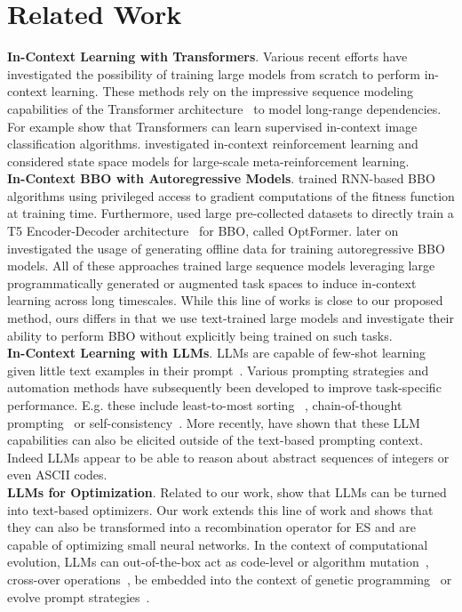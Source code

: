 \documentclass[sigconf]{acmart}
\begin{document}
\section{Related Work}
\textbf{In-Context Learning with Transformers}. Various recent efforts have investigated the possibility of training large models from scratch to perform in-context learning. These methods rely on the impressive sequence modeling capabilities of the Transformer architecture~\cite{vaswani2017attention} to model long-range dependencies. For example \citet{kirsch2022general} show that Transformers can learn supervised in-context image classification algorithms. \citet{laskin2022context} investigated in-context reinforcement learning and \citet{lu2023structured} considered state space models for large-scale meta-reinforcement learning. \\
\textbf{In-Context BBO with Autoregressive Models}. \citet{chen2017learning} trained RNN-based BBO algorithms using privileged access to gradient computations of the fitness function at training time. Furthermore, \citet{dery2022multi, chen2022towards} used large pre-collected datasets to directly train a T5 Encoder-Decoder architecture~\cite{raffel2020exploring} for BBO, called OptFormer. \citet{krishnamoorthy2022generative} later on investigated the usage of generating offline data for training autoregressive BBO models. All of these approaches trained large sequence models leveraging large programmatically generated or augmented task spaces to induce in-context learning across long timescales.
While this line of works is close to our proposed method, ours differs in that we use text-trained large models and investigate their ability to perform BBO without explicitly being trained on such tasks.\\
\textbf{In-Context Learning with LLMs}. LLMs are capable of few-shot learning given little text examples in their prompt~\cite{brown2020language}. Various prompting strategies and automation methods have subsequently been developed to improve task-specific performance. E.g. these include least-to-most sorting ~\cite{zhou2022least}, chain-of-thought prompting~\cite{wei2022chain} or self-consistency~\cite{wang2022self}. More recently, \citet{mirchandani2023large} have shown that these LLM capabilities can also be elicited outside of the text-based prompting context. Indeed LLMs appear to be able to reason about abstract sequences of integers or even ASCII codes.\\
\textbf{LLMs for Optimization}. Related to our work, \citet{yang2023large, zhang2023using, nie2023importance} show that LLMs can be turned into text-based optimizers. Our work extends this line of work and shows that they can also be transformed into a recombination operator for ES and are capable of optimizing small neural networks. In the context of computational evolution, LLMs can out-of-the-box act as code-level or algorithm mutation~\cite{chen2023evoprompting, liu2023algorithm}, cross-over operations~\cite{meyerson2023language}, be embedded into the context of genetic programming~\cite{lehman2023evolution} or evolve prompt strategies~\cite{guo2023connecting}.
\end{document}

